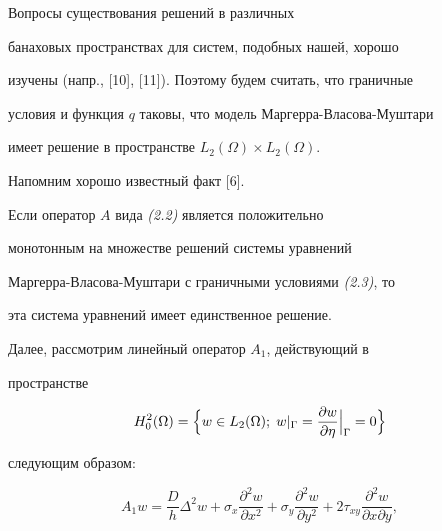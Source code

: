  


\begin{note} Вопросы существования решений в различных 


банаховых пространствах для систем, подобных нашей, хорошо 


изучены (напр., [10], [11]). Поэтому будем считать, что граничные 


условия и функция $q$ таковы, что модель Маргерра-Власова-Муштари 


имеет решение в пространстве $L_2(\Omega)\times L_2(\Omega)$. 


\end{note} 


 


Напомним хорошо известный факт [6]. 


 


\begin{lems} Если оператор $A$ вида {\em (2.2)} является положительно 


монотонным на множестве решений системы уравнений 


Маргерра-Власова-Муштари с граничными условиями {\em (2.3)}, то 


эта система уравнений имеет единственное решение. 


\end{lems} 


 


Далее, рассмотрим линейный оператор $A_1$, действующий в 


пространстве 


$$ 


H^2_0(\Omega)=\Bigl\{w\in L_2(\Omega);\;w|_\Gamma= 


\Bigl.\frac{\partial w}{\partial\eta}\Bigr|_\Gamma=0\Bigr\} 


$$ 


следующим образом: 


\begin{equation} 


A_1w=\frac{D}{h}\Delta^2w+\sigma_x 


\frac{\partial^2 w}{\partial x^2}+\sigma_y 


\frac{\partial^2 w}{\partial y^2}+2\tau_{xy} 


\frac{\partial^2 w}{\partial x\partial y}, 


\end{equation} 


